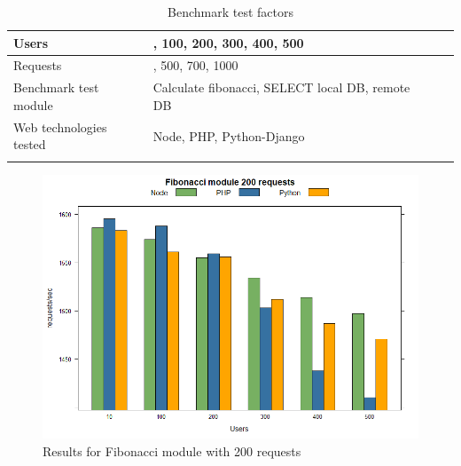 \documentclass[../thesis.tex]{subfiles}
\begin{document}
\begin{table}[H]
	\caption{Benchmark test factors}
	\centering
	\footnotesize
	\label{tab1}
	\begin{tabular}{!{\color{sapphire}\vrule width 1pt}m{0.22\textwidth}!{\color{black}\vrule width 1pt}m{0.22\textwidth}!{\color{black}\vrule width 1pt}m{0.22\textwidth}!{\color{black}\vrule width 1pt}m{0.22\textwidth}!{\color{sapphire}\vrule width 1pt}}
		\hline
		\Centering Users &
		, 100, 200, 300, 400, 500 \\
		\hline
		\Centering Requests &
		, 500, 700, 1000 \\
		\hline
		\Centering Benchmark test module & 
		\Centering Calculate fibonacci, SELECT local DB, remote DB \\
		\hline
		\Centering Web technologies tested & 
		\Centering Node, PHP, Python-Django \\
		\hline
		\hline
	\end{tabular}
\end{table} 
\lipsum[1-1]
\begin{figure}[H]
	\centering
	\includegraphics[width=1\textwidth]{../images/200requestsFibo.png}
	\caption{Results for Fibonacci module with 200 requests}
	\label{rys1}
\end{figure}
\end{document}
